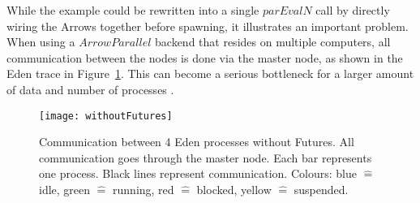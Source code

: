 \documentclass{jfp1}
\newcommand{\Conid}[1]{\mathit{#1}}
\newcommand{\Varid}[1]{\mathit{#1}}
\newcommand{\comm}[2]{}
\newcommand{\olcomment}[1]{\comm{OL}{#1}}
\newcommand{\mbcomment}[1]{\comm{MB}{#1}}
\begin{document}
While the example could be rewritten into a single \ensuremath{\Varid{parEvalN}} call by directly wiring the Arrows together before spawning, it illustrates an important problem. When using a \ensuremath{\Conid{ArrowParallel}} backend that resides on multiple computers, all communication between the nodes is done via the master node, as shown in the Eden trace in Figure~\ref{fig:withoutFutures}. This can become a serious bottleneck
for a larger amount of data and number of processes \citep[as e.g.][showcases]{Berthold2009-fft}.
\begin{figure}[ht]
	\centering
	\texttt{[image: withoutFutures]}
	\caption[without Futures]{Communication between 4 Eden processes without Futures. All communication goes through the master node. Each bar represents one process. Black lines represent communication. Colours: blue $\hat{=}$ idle, green $\hat{=}$ running, red  $\hat{=}$ blocked, yellow $\hat{=}$ suspended.}
	\label{fig:withoutFutures}
\end{figure}
\end{document}
